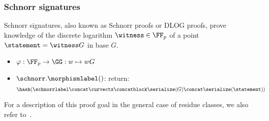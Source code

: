 \documentclass[11pt]{article}
\begin{document}
\subsubsection{Schnorr signatures}\label{sec:instantiations:schnorr}
Schnorr signatures, also known as Schnorr proofs or DLOG proofs, prove knowledge of the discrete logarithm $\witness \in \FF_p$ of a point $\statement=\witness G$ in base $G$.

\begin{itemize}
  \item $\varphi:\FF_p\to\GG:w\mapsto wG$
  \item $\schnorr.\morphismlabel()$: return:
  \[
    \hash(\schnorrlabel \concat \curvectx \concatblock \serialize(G) \concat \serialize(\statement))
  \]
\end{itemize}

For a description of this proof goal in the general case of residue classes, we also refer to~\cite[1.4.1]{zkproof-reference}.

\end{document}
